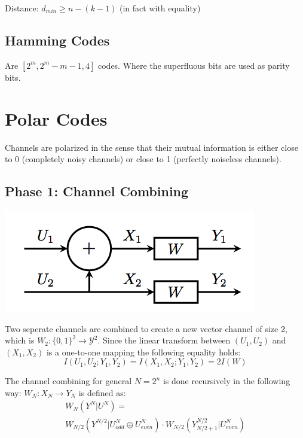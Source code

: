\documentclass[10pt,a4paper,landscape]{article}
\begin{document}
\begin{multicols*}{4}
Distance: $d_{min} \geq n-(k-1)$ (in fact with equality)

\subsection{Hamming Codes}
Are $[2^m, 2^m - m - 1, 4]$ codes. Where the superfluous bits are used as parity bits.

\section{Polar Codes}

Channels are polarized in the sense that their mutual information is either close to 0 (completely noisy channels) or close to 1 (perfectly noiseless channels).

\subsection{Phase 1: Channel Combining}

\begin{colfig}
	\centering
	\includegraphics[width=\linewidth]{polar-basic-scheme.png}
\end{colfig}

Two seperate channels are combined to create a new vector channel of size 2, which is $W_2: \{0, 1\}^2 \rightarrow \mathcal{Y}^2$. Since the linear transform between $(U_1, U_2)$ and $(X_1, X_2)$ is a one-to-one mapping the following equality holds:
$$I(U_1, U_2; Y_1, Y_2) = I(X_1, X_2; Y_1, Y_2) = 2I(W)$$

The channel combining for general $N = 2^n$ is done recursively in the following way: $W_N: X_N \rightarrow Y_N$ is defined as:
\begin{multline*}
	W_N(Y^N |U^N) = \\
	W_{N/2}(Y^{N/2}|U_{odd}^N \oplus U_{even}^N) \cdot W_{N/2}(Y_{N/2+1}^{N/2}|U^N_{even})
\end{multline*}


\end{multicols*}
\end{document}
